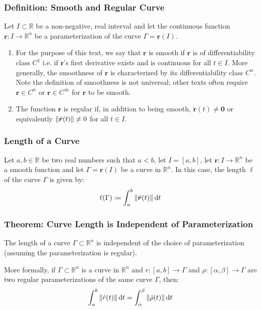 \documentclass[11pt, a4paper]{article}
\newcommand{\diff}{\mathop{}\!\mathrm{d}} %
\newcommand{\R}{\mathbb{R}} %
\begin{document}
\subsubsection{Definition: Smooth and Regular Curve}
Let $ I \subset \mathbb{R} $ be a non-negative, real interval and let the continuous function $ \bm{r} : I \rightarrow \mathbb{R}^n $ be a parameterization of the curve $ \Gamma = \bm{r}(I) $.

\begin{enumerate}
	\item For the purpose of this text, we say that $ \bm{r} $ is smooth  if $ \bm{r} $ is of differentiability class $ C^1 $ i.e. if $ \bm{r} $'s first derivative exists and is continuous for all $ t \in I $. More generally, the smoothness of $ \bm{r} $ is characterized by its differentiability class $ C^n $. Note the definition of smoothness is not universal; other texts often require $ \bm{r} \in C^n $ or $ \bm{r} \in C^\infty $ for $ \bm{r} $ to be smooth.
	\item The function $ \bm{r} $ is regular if, in addition to being smooth, $\dot{\bm{r}}(t) \neq \bm{0} $ or equivalently $ \norm{\dot{\bm{r}}(t)} \neq 0$ for all $ t \in I $.
\end{enumerate}

\subsubsection{Length of a Curve}
Let $ a, b \in \mathbb{R} $ be two real numbers such that $ a < b $, let $ I = [a, b] $, let $ \bm{r} : I \rightarrow \mathbb{R}^n $ be a smooth function and let $ \Gamma = \bm{r}(I) $ be a curve in $ \mathbb{R}^n $. In this case, the length $ \ell $ of the curve $ \Gamma $ is given by:
\begin{equation*}
	\ell(\Gamma) \coloneqq \int_{a}^{b} \norm{\dot{\bm{r}}(t)} \diff t
\end{equation*}

\subsubsection{Theorem: Curve Length is Independent of Parameterization}
The length of a curve $ \Gamma \subset \mathbb{R}^n $ is independent of the choice of parameterization (assuming the parameterization is regular). 

More formally, if $ \Gamma \subset \R^n $ is a curve in $ \R^n $ and $ r : [a, b] \rightarrow \Gamma $ and $ \rho : [\alpha, \beta] \rightarrow \Gamma $ are two regular parameterizations of the same curve $ \Gamma $, then:
\begin{equation*}
	\int_{a}^{b} \norm{\dot{r}(t)} \diff t = 		\int_{\alpha}^{\beta} \norm{\dot{\rho}(t)} \diff t
\end{equation*}
\end{document}
